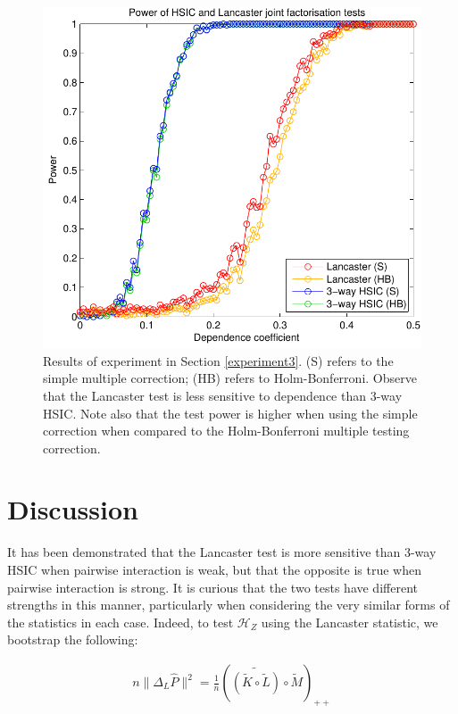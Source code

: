 \documentclass[]{article}
\begin{document}
\begin{figure}[ht]
\vskip 0.2in
\begin{center}
\centerline{\includegraphics[scale=0.6]{UAI_Figure3.pdf}}
\caption{Results of experiment in Section \ref{experiment3}. (S) refers to the simple multiple correction; (HB) refers to Holm-Bonferroni. Observe that the Lancaster test is less sensitive to dependence than 3-way HSIC. Note also that the test power is higher when using the simple correction when compared to the Holm-Bonferroni multiple testing correction.}
\label{strong-pairwise}
\end{center}
\vskip -0.2in
\end{figure} 

\section{Discussion}

It has been demonstrated that the Lancaster test is more sensitive than 3-way HSIC when pairwise interaction is weak, but that the opposite is true when pairwise interaction is strong. It is curious that the two tests have different strengths in this manner, particularly when considering the very similar forms of the statistics in each case. Indeed, to test $\mathcal{H}_Z$ using the Lancaster statistic, we bootstrap the following:

\begin{align*}
n\|\Delta_L\hat{P}\|^2 = \frac{1}{n}\left(\widetilde{\left( \tilde{K} \circ \tilde{L}\right) }\circ \tilde{M} \right)_{++}
\end{align*}
\end{document}
